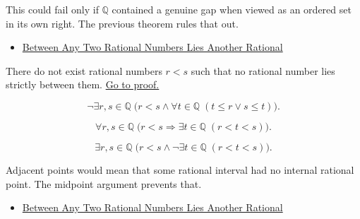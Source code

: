 \begin{remark*}
This could fail only if $\mathbb{Q}$ contained a genuine gap when viewed as an
ordered set in its own right. The previous theorem rules that out.
\end{remark*}

\begin{dependencies}
\begin{itemize}
  \item \hyperref[thm:between-any-two-rationals-is-a-rational]{Between Any Two Rational Numbers Lies Another Rational}
\end{itemize}
\end{dependencies}

\begin{corollary}
\label{cor:q-has-no-adjacent-points}
There do not exist rational numbers $r<s$ such that no rational number lies
strictly between them.
\hyperref[prf:q-has-no-adjacent-points]{Go to proof.}
\end{corollary}

\begin{remark*}
\[
\neg\exists r,s\in\mathbb{Q}\;
\bigl(r<s \land \forall t\in\mathbb{Q}\;(t\le r \lor s\le t)\bigr).
\]
\end{remark*}

\begin{remark*}
\[
\forall r,s\in\mathbb{Q}\;
\bigl(r<s \Longrightarrow \exists t\in\mathbb{Q}\;(r<t<s)\bigr).
\]
\end{remark*}

\begin{remark*}
\[
\exists r,s\in\mathbb{Q}\;
\bigl(r<s \land \neg\exists t\in\mathbb{Q}\;(r<t<s)\bigr).
\]
\end{remark*}

\begin{remark*}
Adjacent points would mean that some rational interval had no internal rational
point. The midpoint argument prevents that.
\end{remark*}

\begin{dependencies}
\begin{itemize}
  \item \hyperref[thm:between-any-two-rationals-is-a-rational]{Between Any Two Rational Numbers Lies Another Rational}
\end{itemize}
\end{dependencies}

